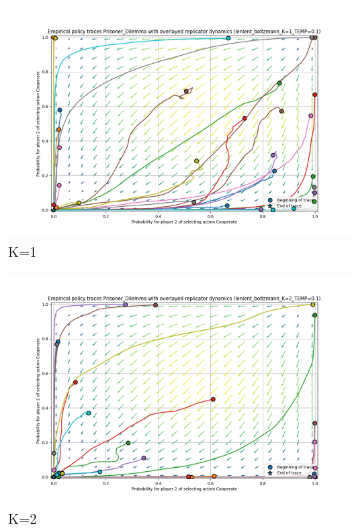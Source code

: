 \documentclass[12pt,a4paper, onecolumn]{exam}
\begin{document}
\begin{appendices}
    \begin{figure}[H]
        \centering
        \begin{subfigure}{0.44\textwidth}
            \centering
            \includegraphics[width=\linewidth]{plots/replicator_trajectoreis_Prisoner_Dilemma_lenient_boltzmann_K=1_TEMP=0.1.png}
            \caption{K=1}
        \end{subfigure}
        \hfill
        \begin{subfigure}{0.44\textwidth}
            \centering
            \includegraphics[width=\linewidth]{plots/replicator_trajectoreis_Prisoner_Dilemma_lenient_boltzmann_K=2_TEMP=0.1.png}
            \caption{K=2}
        \end{subfigure}
        \vspace{0.5cm}
        \begin{subfigure}{0.44\textwidth}
            \centering

\end{subfigure}
\end{figure}
\end{appendices}
\end{document}
